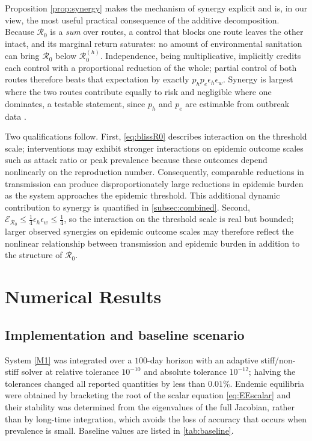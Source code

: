 \documentclass[11pt]{article}
\theoremstyle{plain}
\theoremstyle{definition}
\theoremstyle{remark}
\newcommand{\Rz}{\mathcal{R}_0}
\newcommand{\Rzh}{\mathcal{R}_0^{(h)}}
\begin{document}
Proposition \ref{prop:synergy} makes the mechanism of synergy explicit and is, in our view, the most useful practical consequence of the additive decomposition. Because $\Rz$ is a \emph{sum} over routes, a control that blocks one route leaves the other intact, and its marginal return saturates: no amount of environmental sanitation can bring $\Rz$ below $\Rzh$. Independence, being multiplicative, implicitly credits each control with a proportional reduction of the whole; partial control of both routes therefore beats that expectation by exactly $p_hp_e\epsilon_h\epsilon_w$. Synergy is largest where the two routes contribute equally to risk and negligible where one dominates, a testable statement, since $p_h$ and $p_e$ are estimable from outbreak data \cite{mukandavire2011estimating}.

Two qualifications follow. First, \eqref{eq:blissR0} describes interaction on the threshold scale; interventions may exhibit stronger interactions on epidemic outcome scales such as attack ratio or peak prevalence because these outcomes depend nonlinearly on the reproduction number. Consequently, comparable reductions in transmission can produce disproportionately large reductions in epidemic burden as the system approaches the epidemic threshold. This additional dynamic contribution to synergy is quantified in \cref{subsec:combined}. Second, $\mathcal{E}_{\Rz}\le\tfrac14\epsilon_h\epsilon_w\le\tfrac14$, so the interaction on the threshold scale is real but bounded; larger observed synergies on epidemic outcome scales may therefore reflect the nonlinear relationship between transmission and epidemic burden in addition to the structure of $\Rz$.

\section{Numerical Results}\label{sec4}

\subsection{Implementation and baseline scenario}\label{subsec:numerics}

System \eqref{M1} was integrated over a $100$-day horizon with an adaptive stiff/non-stiff solver at relative tolerance $10^{-10}$ and absolute tolerance $10^{-12}$; halving the tolerances changed all reported quantities by less than $0.01\%$. Endemic equilibria were obtained by bracketing the root of the scalar equation \eqref{eq:EEscalar} and their stability was determined from the eigenvalues of the full Jacobian, rather than by long-time integration, which avoids the loss of accuracy that occurs when prevalence is small. Baseline values are listed in \cref{tab:baseline}.
\end{document}
